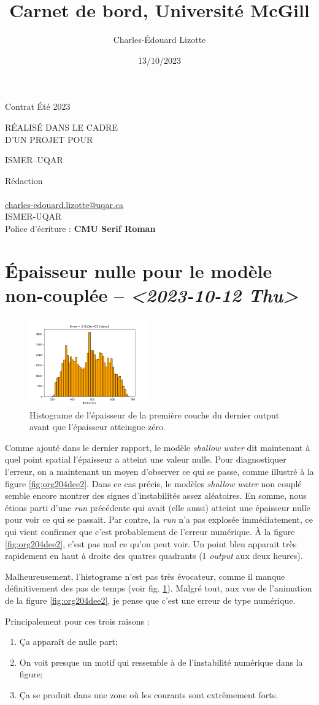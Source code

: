 \documentclass[10pt]{article}
\author{Charles-Édouard Lizotte}
\date{13/10/2023}
\title{Carnet de bord, Université McGill}
\makeatletter
\numberwithin{equation}{section}
\newcommand{\mytitlepage}{
\begin{titlepage}
\begin{center}
{\Huge \thesubtitle \par}
\vspace{2cm}
{\Huge \MakeUppercase{\thetitle} \par}
\vspace{2cm}
RÉALISÉ DANS LE CADRE\\ D'UN PROJET POUR \par
\vspace{2cm}
{\Huge ISMER--UQAR \par}
\vspace{2cm}
{\thedate}
\end{center}
\vfill
Rédaction \\
{\theauthor}\\
\url{charles-edouard.lizotte@uqar.ca}\\
ISMER-UQAR\\
Police d'écriture : \textbf{CMU Serif Roman}
\end{titlepage}
}
\newcommand{\thesubtitle}{Contrat Été 2023}
\makeatother
\begin{document}
\mytitlepage
\tableofcontents\newpage
\section{Épaisseur nulle pour le modèle non-couplée -- \textit{<2023-10-12 Thu>}}
\label{sec:orgb54329a}

\begin{figure}\vspace{-\baselineskip} \centering
\centering
\includegraphics[width=0.45\textwidth]{figures/debuggage/2023_10_08_thickness1_histo.png}
\caption{\label{fig:org63e7290}Histograme de l'épaisseur de la première couche du dernier output avant que l'épaisseur atteingne zéro.}
\end{figure}


Comme ajouté dans le dernier rapport, le modèle \emph{shallow water} dit maintenant à quel point spatial l'épaisseur a atteint une valeur nulle.
Pour diagnostiquer l'erreur, on a maintenant un moyen d'observer ce qui se passe, comme illustré à la figure \ref{fig:org204dee2}.
Dans ce cas précis, le modèles \emph{shallow water} non couplé semble encore montrer des signes d'instabilités assez aléatoires.
En somme, nous étions parti d'une \emph{run} précédente qui avait (elle aussi) atteint une épaisseur nulle pour voir ce qui se passait.
Par contre, la \emph{run} n'a pas explosée immédiatement, ce qui vient confirmer que c'est probablement de l'erreur numérique.
À la figure \ref{fig:org204dee2}, c'est pas mal ce qu'on peut voir.
Un point bleu apparait très rapidement en haut à droite des quatres quadrants (1 \emph{output} aux deux heures). \bigskip

Malheureusement, l'histograme n'est pas très évocateur, comme il manque définitivement des pas de temps (voir fig. \ref{fig:org63e7290}).
Malgré tout, aux vue de l'animation de la figure \ref{fig:org204dee2}, je pense que c'est une erreur de type numérique.\bigskip

Principalement pour ces trois raisons : 
\begin{enumerate}
\item Ça apparaît de nulle part;
\item On voit presque un motif qui ressemble à de l'instabilité numérique dans la figure;
\item Ça se produit dans une zone où les courants sont extrêmement forts.
\end{enumerate}
\end{document}
